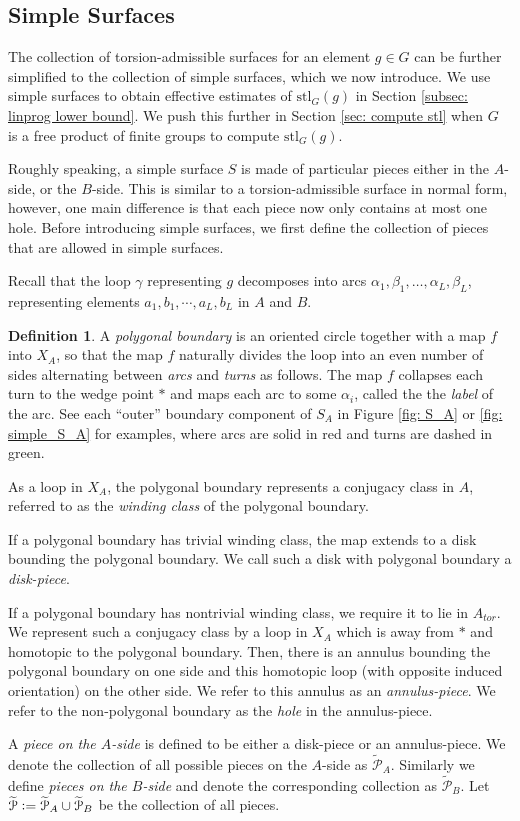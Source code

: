 \documentclass{amsart}
\theoremstyle{definition}
\newtheorem{definition}[theorem]{Definition}
\numberwithin{equation}{section}
\theoremstyle{theorem}
\theoremstyle{remark}
\def\stl{\mathrm{stl}}
\def\defeq{\vcentcolon=}
\def\tcP{\widetilde{\mathcal{P}}}
\begin{document}
	
	\subsection{Simple Surfaces}\label{subsec: simple surf}
	
	The collection of torsion-admissible surfaces for an element $g\in G$ can be further simplified to the collection of simple surfaces, which we now introduce. We use simple surfaces to obtain effective estimates of $\stl_G(g)$ in Section \ref{subsec: linprog lower bound}.
	We push this further in Section \ref{sec: compute stl} when $G$ is a free product of finite groups to compute $\stl_G(g)$.
	
	Roughly speaking, a simple surface $S$ is made of particular pieces either in the $A$-side, or the $B$-side. This is similar to a torsion-admissible surface in normal form, however, one main difference is that each piece now only contains at most one hole.
	Before introducing simple surfaces, we first define the collection of pieces that are allowed in simple surfaces.
	
	Recall that the loop $\gamma$ representing $g$ decomposes into arcs $\alpha_1,\beta_1,\ldots,\alpha_L,\beta_L$,
	representing elements $a_1,b_1,\cdots,a_L,b_L$ in $A$ and $B$.
	
	\begin{definition}
		A \emph{polygonal boundary} is an oriented circle together with a map $f$ into $X_A$, so that the map $f$ naturally divides the loop into an even number of sides alternating between \emph{arcs} and \emph{turns} as follows. The map $f$ collapses each turn to the wedge point $*$ and maps each arc to some $\alpha_i$, called the the \emph{label} of the arc.
		See each ``outer'' boundary component of $S_A$ in Figure \ref{fig: S_A} or \ref{fig: simple_S_A} for examples, where arcs are solid in red and turns are dashed in green.
		
		As a loop in $X_A$, the polygonal boundary represents a conjugacy class in $A$, referred to as the \emph{winding class} of the polygonal boundary. 
		
		If a polygonal boundary has trivial winding class, the map extends to a disk bounding the polygonal boundary. We call such a disk with polygonal boundary a \emph{disk-piece}.
		
		If a polygonal boundary has nontrivial winding class, we require it to lie in $A_{tor}$. We represent such a conjugacy class by a loop in $X_A$ which is away from $*$ and homotopic to the polygonal boundary. Then, there is an annulus bounding the polygonal boundary on one side and this homotopic loop (with opposite induced orientation) on the other side.
        We refer to this annulus as an \emph{annulus-piece}.
		We refer to the non-polygonal boundary as the \emph{hole} in the annulus-piece.
		
		A \emph{piece on the $A$-side} is defined to be either a disk-piece or an annulus-piece. We denote the collection of all possible pieces on the $A$-side as $\tcP_A$.
		Similarly we define \emph{pieces on the $B$-side} and denote the corresponding collection as $\tcP_B$. Let $\tcP\defeq\tcP_A\cup\tcP_B$ be the collection of all pieces.
	\end{definition}
	
\end{document}
